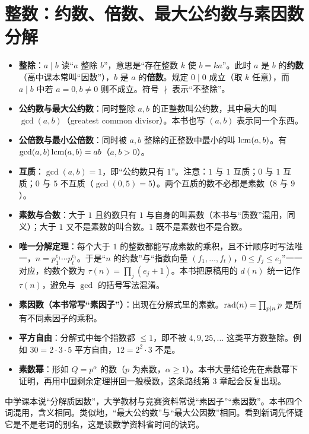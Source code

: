 \section{整数：约数、倍数、最大公约数与素因数分解}
\begin{itemize}
\item \textbf{整除}：$a\mid b$ 读“$a$ 整除 $b$”，意思是“存在整数 $k$ 使 $b=ka$”。此时 $a$ 是 $b$ 的\textbf{约数}（高中课本常叫“因数”），$b$ 是 $a$ 的\textbf{倍数}。规定 $0\mid 0$ 成立（取 $k$ 任意），而 $a\mid b$ 中若 $a=0,b\ne0$ 则不成立。符号 $\nmid$ 表示“不整除”。
\item \textbf{公约数与最大公约数}：同时整除 $a,b$ 的正整数叫公约数，其中最大的叫 $\gcd(a,b)$（greatest common divisor）。本书也写 $(a,b)$ 表示同一个东西。
\item \textbf{公倍数与最小公倍数}：同时被 $a,b$ 整除的正整数中最小的叫 $\operatorname{lcm}(a,b)$。有 $\gcd(a,b)\operatorname{lcm}(a,b)=ab$（$a,b>0$）。
\item \textbf{互质}：$\gcd(a,b)=1$，即“公约数只有 $1$”。注意：$1$ 与 $1$ 互质；$0$ 与 $1$ 互质；$0$ 与 $5$ 不互质（$\gcd(0,5)=5$）。两个互质的数不必都是素数（$8$ 与 $9$）。
\item \textbf{素数与合数}：大于 $1$ 且约数只有 $1$ 与自身的叫素数（本书与“质数”混用，同义）；大于 $1$ 又不是素数的叫合数。$1$ 既不是素数也不是合数。
\item \textbf{唯一分解定理}：每个大于 $1$ 的整数都能写成素数的乘积，且不计顺序时写法唯一，$n=p_1^{e_1}\cdots p_t^{e_t}$。于是“$n$ 的约数”与“指数向量 $(f_1,\ldots,f_t)$，$0\le f_j\le e_j$”一一对应，约数个数为
$\tau(n)=\prod_j(e_j+1)$。本书把原稿用的 $d(n)$ 统一记作 $\tau(n)$，避免与 $\gcd$ 的括号写法混淆。
\item \textbf{素因数（本书常写“素因子”）}：出现在分解式里的素数。$\operatorname{rad}(n)=\prod_{p\mid n}p$ 是所有不同素因子的乘积。
\item \textbf{平方自由}：分解式中每个指数都 $\le1$，即不被 $4,9,25,\ldots$ 这类平方数整除。例如 $30=2\cdot3\cdot5$ 平方自由，$12=2^2\cdot3$ 不是。
\item \textbf{素数幂}：形如 $Q=p^\alpha$ 的数（$p$ 为素数，$\alpha\ge1$）。本书大量结论先在素数幂下证明，再用中国剩余定理拼回一般模数，这条路线第 3 章起会反复出现。
\end{itemize}

\begin{tip}
中学课本说“分解质因数”，大学教材与竞赛资料常说“素因子”“素因数”。本书四个词混用，含义相同。类似地，“最大公约数”与“最大公因数”相同。看到新词先怀疑它是不是老词的别名，这是读数学资料省时间的诀窍。
\end{tip}

